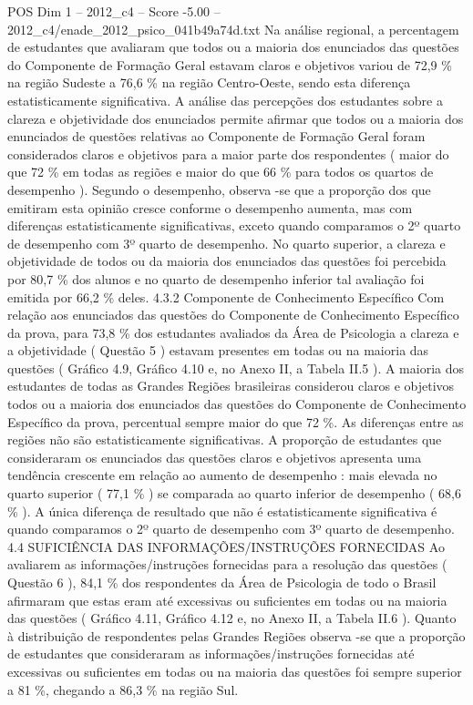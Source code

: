 \begin{textsample}{POS Dim 1 – 2012\_c4 – Score -5.00 – 2012\_c4/enade\_2012\_psico\_041b49a74d.txt}
Na análise regional, a percentagem de estudantes que avaliaram que todos ou a maioria dos enunciados das questões do Componente de Formação Geral estavam claros e objetivos variou de 72,9 \% na região Sudeste a 76,6 \% na região Centro-Oeste, sendo esta diferença estatisticamente significativa.
A análise das percepções dos estudantes sobre a clareza e objetividade dos enunciados permite afirmar que todos ou a maioria dos enunciados de questões relativas ao Componente de Formação Geral foram considerados claros e objetivos para a maior parte dos respondentes ( maior do que 72 \% em todas as regiões e maior do que 66 \% para todos os quartos de desempenho ).
Segundo o desempenho, observa -se que a proporção dos que emitiram esta opinião cresce conforme o desempenho aumenta, mas com diferenças estatisticamente significativas, exceto quando comparamos o 2º quarto de desempenho com 3º quarto de desempenho.
No quarto superior, a clareza e objetividade de todos ou da maioria dos enunciados das questões foi percebida por 80,7 \% dos alunos e no quarto de desempenho inferior tal avaliação foi emitida por 66,2 \% deles. 4.3.2 Componente de Conhecimento Específico Com relação aos enunciados das questões do Componente de Conhecimento Específico da prova, para 73,8 \% dos estudantes avaliados da Área de Psicologia a clareza e a objetividade ( Questão 5 ) estavam presentes em todas ou na maioria das questões ( Gráfico 4.9, Gráfico 4.10 e, no Anexo II, a Tabela II.5 ).
A maioria dos estudantes de todas as Grandes Regiões brasileiras considerou claros e objetivos todos ou a maioria dos enunciados das questões do Componente de Conhecimento Específico da prova, percentual sempre maior do que 72 \%.
As diferenças entre as regiões não são estatisticamente significativas.
A proporção de estudantes que consideraram os enunciados das questões claros e objetivos apresenta uma tendência crescente em relação ao aumento de desempenho : mais elevada no quarto superior ( 77,1 \% ) se comparada ao quarto inferior de desempenho ( 68,6 \% ).
A única diferença de resultado que não é estatisticamente significativa é quando comparamos o 2º quarto de desempenho com 3º quarto de desempenho. 4.4 SUFICIÊNCIA DAS INFORMAÇÕES/INSTRUÇÕES FORNECIDAS Ao avaliarem as informações/instruções fornecidas para a resolução das questões ( Questão 6 ), 84,1 \% dos respondentes da Área de Psicologia de todo o Brasil afirmaram que estas eram até excessivas ou suficientes em todas ou na maioria das questões ( Gráfico 4.11, Gráfico 4.12 e, no Anexo II, a Tabela II.6 ).
Quanto à distribuição de respondentes pelas Grandes Regiões observa -se que a proporção de estudantes que consideraram as informações/instruções fornecidas até excessivas ou suficientes em todas ou na maioria das questões foi sempre superior a 81 \%, chegando a 86,3 \% na região Sul.

\end{textsample}
